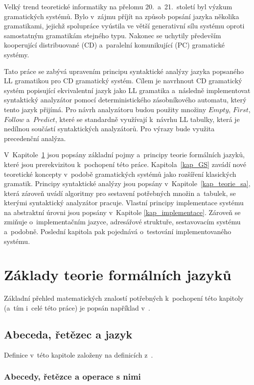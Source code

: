 Velký trend teoretické informatiky na přelomu 20.~a~21.~století byl výzkum gramatických systémů.
Bylo v~zájmu příjít na způsob popsání jazyka několika gramatikami, jejichž spolupráce vyústila ve větší generativní sílu systému oproti samostatným gramatikám stejného typu.
Nakonec se uchytily především kooperující distribuované (CD) a~paralelní komunikující (PC) gramatické systémy.

Tato práce se zabývá upravením principu syntaktické analýzy jazyka popsaného LL gramatikou pro CD gramatický systém.
Cílem je navrhnout CD gramatický systém popisující ekvivalentní jazyk jako LL gramatika a~následně implementovat syntaktický analyzátor pomocí deterministického zásobníkového automatu, který tento jazyk přijímá.
Pro návrh analyzátoru budou použity množiny $Empty$, $First$, $Follow$ a~$Predict$, které se standardně využívají k~návrhu LL tabulky, která je nedílnou součástí syntaktických analyzátorů.
Pro výrazy bude využita precedenční analýza.  

V~Kapitole~\ref{kap_teorie} jsou popsány základní pojmy a~principy teorie formálních jazyků, které jsou prerekvizitou k~pochopení této práce.
Kapitola~\ref{kap_GS} zavádí nové teoretické koncepty v~podobě gramatických systémů jako rozšíření klasických gramatik.
Principy syntaktické analýzy jsou popsány v~Kapitole~\ref{kap_teorie_sa}, která zároveň uvádí algoritmy pro sestavení potřebných množin a~tabulek, se kterými syntaktický analyzátor pracuje.
Vlastní principy implementace systému na abstraktní úrovni jsou popsány v~Kapitole \ref{kap_implementace}.
Zároveň se zmiňuje o~implementačním jazyce, adresářové struktuře, sestavovacím systému a~podobně.
Poslední kapitola pak pojednává o~testování implementovaného systému.

\chapter{Základy teorie formálních jazyků}\label{kap_teorie}
Základní přehled matematických znalostí potřebných k~pochopení této kapitoly (a~tím i~celé této práce) je popsán například v~\cite{meduna_zemek_2014}.

\section{Abeceda, řetězec a jazyk}\label{kap_abec_ret_jazyk}
Definice v~této kapitole založeny na definicích z~\cite{hopcroft2006introduction, handbook1-zaklady, TIN-opora}.

\subsection*{Abecedy, řetězce a operace s nimi}

